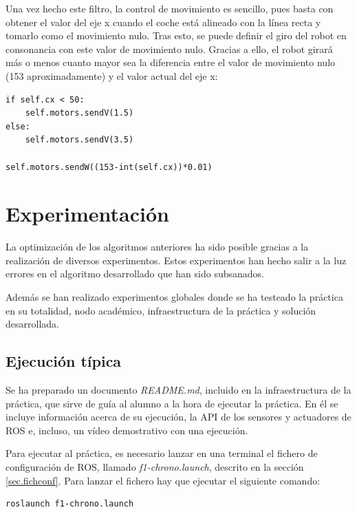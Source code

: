 Una vez hecho este filtro, la control de movimiento es sencillo, pues basta con obtener el valor del eje x cuando el coche está alineado con la línea recta y tomarlo como el movimiento nulo. Tras esto, se puede definir el giro del robot en consonancia con este valor de movimiento nulo.
Gracias a ello, el robot girará más o menos cuanto mayor sea la diferencia entre el valor de movimiento nulo (153 aproximadamente) y el valor actual del eje x:

\lstset{language=Python, breaklines=true, basicstyle=\footnotesize}
\begin{lstlisting}[frame=single]
if self.cx < 50:
    self.motors.sendV(1.5)
else:
    self.motors.sendV(3.5)

self.motors.sendW((153-int(self.cx))*0.01)
\end{lstlisting}

\section{Experimentación}
La optimización de los algoritmos anteriores ha sido posible gracias a la realización de diversos experimentos. Estos experimentos han hecho salir a la luz errores en el algoritmo desarrollado que han sido subsanados.

Además se han realizado experimentos globales donde se ha testeado la práctica en su totalidad, nodo académico, infraestructura de la práctica y solución desarrollada.

\subsection{Ejecución típica}
Se ha preparado un documento \textit{README.md}, incluido en la infraestructura de la práctica, que sirve de guía al alumno a la hora de ejecutar la práctica. En él se incluye información acerca de su ejecución, la API de los sensores y actuadores de ROS e, incluso, un vídeo demostrativo con una ejecución.

Para ejecutar al práctica, es necesario lanzar en una terminal el fichero de configuración de ROS, llamado \textit{f1-chrono.launch}, descrito en la sección \ref{sec.fichconf}. Para lanzar el fichero hay que ejecutar el siguiente comando:

\lstset{language=bash, breaklines=true, basicstyle=\footnotesize}
\begin{lstlisting}[frame=single]
roslaunch f1-chrono.launch
\end{lstlisting}

